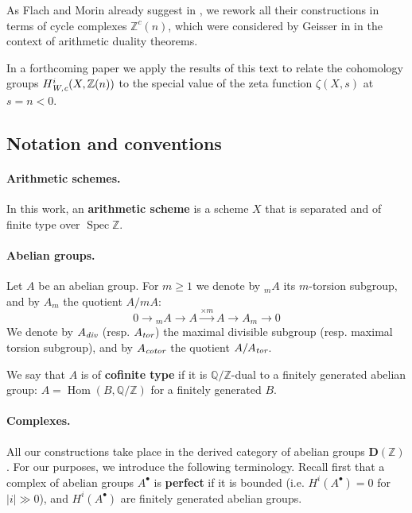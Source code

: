 \documentclass[leqno,12pt]{article}
\theoremstyle{plain}
\theoremstyle{definition}
\DeclareMathOperator{\Spec}{Spec}
\DeclareMathOperator{\Hom}{Hom}
\DeclareMathOperator{\Ext}{Ext}
\newcommand{\QQ}{\mathbb{Q}}
\newcommand{\ZZ}{\mathbb{Z}}
\renewcommand{\div}{\text{\it div}}
\newcommand{\tor}{\text{\it tor}}
\newcommand{\cotor}{\text{\it cotor}}
\newcommand{\Wc}{\text{\it W,c}}
\newcommand{\DZ}{{\mathbf{D} (\ZZ)}}
\begin{document}
As Flach and Morin already suggest in \cite[Remark 3.11]{Flach-Morin-2018},
we rework all their constructions in terms of cycle complexes $\ZZ^c (n)$, which
were considered by Geisser in \cite{Geisser-2010} in the context of arithmetic
duality theorems.

In a forthcoming paper we apply the results of this text to relate the
cohomology groups $H_\Wc^i (X, \ZZ(n))$ to the special value of the zeta
function $\zeta (X, s)$ at $s = n < 0$.

\subsection*{Notation and conventions}

\paragraph{Arithmetic schemes.}
In this work, an \textbf{arithmetic scheme} is a scheme $X$ that is separated
and of finite type over $\Spec \ZZ$.

\paragraph{Abelian groups.}
Let $A$ be an abelian group. For $m \ge 1$ we denote by ${}_m A$ its $m$-torsion
subgroup, and by $A_m$ the quotient $A/mA$:
$$0 \to {}_m A \to A \xrightarrow{\times m} A \to A_m \to 0$$
We denote by $A_\div$ (resp. $A_\tor$) the maximal divisible subgroup
(resp. maximal torsion subgroup), and by $A_\cotor$ the quotient $A/A_\tor$.


We say that $A$ is of \textbf{cofinite type} if it is $\QQ/\ZZ$-dual to a
finitely generated abelian group: $A = \Hom (B,\QQ/\ZZ)$ for a finitely
generated $B$.

\paragraph{Complexes.}
All our constructions take place in the derived category of abelian groups
$\DZ$. For our purposes, we introduce the following terminology. Recall first
that a complex of abelian groups $A^\bullet$ is \textbf{perfect} if it is
bounded (i.e. $H^i (A^\bullet) = 0$ for $|i| \gg 0$), and $H^i (A^\bullet)$ are
finitely generated abelian groups.
\end{document}
